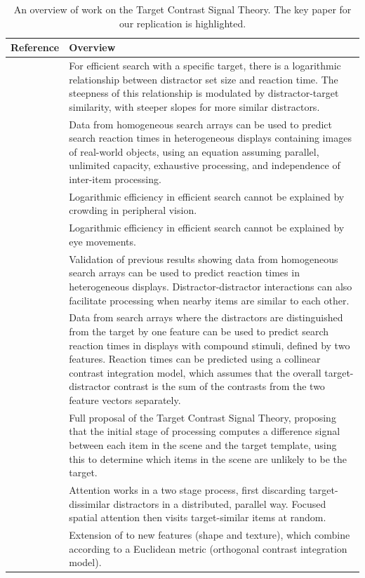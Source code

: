 \documentclass[preprint,12pt,authoryear]{elsarticle}
\begin{document}
\begin{table}[hp]
\centering
\begin{tabularx}{\textwidth}{lX}
Reference & Overview\\
 \hline 
\cite{buetti2016towards} & For efficient search with a specific target, there is a logarithmic relationship between distractor set size and reaction time. The steepness of this relationship is modulated by distractor-target similarity, with steeper slopes for more similar distractors.\\
\cite{wang2017predicting} & Data from homogeneous search arrays can be used to predict search reaction times in heterogeneous displays containing images of real-world objects, using an equation assuming parallel, unlimited capacity, exhaustive processing, and independence of inter-item processing. \\ 
\cite{madison2018role} & Logarithmic efficiency in efficient search cannot be explained by crowding in peripheral vision. \\
\cite{ng2018fixed} & Logarithmic efficiency in efficient search cannot be explained by eye movements. \\
\cite{lleras2019predicting} & Validation of previous results showing data from homogeneous search arrays can be used to predict reaction times in heterogeneous displays. Distractor-distractor interactions can also facilitate processing when nearby items are similar to each other. \\
\textbf{\cite{buetti2019predicting}} & Data from search arrays where the distractors are distinguished from the target by one feature can be used to predict search reaction times in displays with compound stimuli, defined by two features. Reaction times can be predicted using a collinear contrast integration model, which assumes that the overall target-distractor contrast is the sum of the contrasts from the two feature vectors separately. \\
\cite{lleras2020target} & Full proposal of the Target Contrast Signal Theory, proposing that the initial stage of processing computes a difference signal between each item in the scene and the target template, using this to determine which items in the scene are unlikely to be the target. \\
\cite{ng2020prioritization} & Attention works in a two stage process, first discarding target-dissimilar distractors in a distributed, parallel way. Focused spatial attention then visits target-similar items at random. \\
\cite{xu2021predicting} & Extension of \cite{buetti2019predicting} to new features (shape and texture), which combine according to a Euclidean metric (orthogonal contrast integration model). \\
\end{tabularx}
\caption{An overview of work on the Target Contrast Signal Theory. The key paper for our replication is highlighted.}
\label{tab:tcs_overview}
\end{table}
\end{document}
